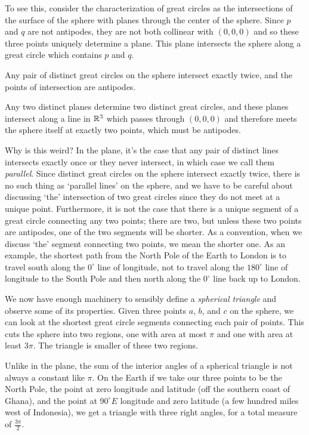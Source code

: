 To see this, consider the characterization of great circles as the intersections of the surface of the sphere with planes through the center of the sphere.  Since $p$ and $q$ are not antipodes, they are not both collinear with $(0,0,0)$ and so these three points uniquely determine a plane.  This plane intersects the sphere along a great circle which contains $p$ and $q$.

\begin{claim}
	Any pair of distinct great circles on the sphere intersect exactly twice, and the points of intersection are antipodes.
\end{claim}

Any two distinct planes determine two distinct great circles, and these planes intersect along a line in $\mathbb{R}^3$ which passes through $(0,0,0)$ and therefore meets the sphere itself at exactly two points, which must be antipodes.

Why is this weird? In the plane, it's the case that any pair of distinct lines intersects exactly once or they never intersect, in which case we call them \textit{parallel}. Since distinct great circles on the sphere intersect exactly twice, there is no such thing as `parallel lines' on the sphere, and we have to be careful about discussing `the' intersection of two great circles since they do not meet at a unique point.  Furthermore, it is not the case that there is a unique segment of a great circle connecting any two points; there are two, but unless these two points are antipodes, one of the two segments will be shorter.  As a convention, when we discuss `the' segment connecting two points, we mean the shorter one.  As an example, the shortest path from the North Pole of the Earth to London is to travel south along the $0^\circ$ line of longitude, not to travel along the $180^\circ$ line of longitude to the South Pole and then north along the $0^\circ$ line back up to London.

We now have enough machinery to sensibly define a \textit{spherical triangle} and observe some of its properties. Given three points $a$, $b$, and $c$ on the sphere, we can look at the shortest great circle segments connecting each pair of points.  This cuts the sphere into two regions, one with area at most $\pi$ and one with area at least $3\pi$.  The triangle is smaller of these two regions.


Unlike in the plane, the sum of the interior angles of a spherical triangle is not always a constant like $\pi$.  On the Earth if we take our three points to be the North Pole, the point at zero longitude and latitude (off the southern coast of Ghana), and the point at $90^\circ E$ longitude and zero latitude (a few hundred miles west of Indonesia), we get a triangle with three right angles, for a total measure of $\tfrac{3\pi}{2}$.



